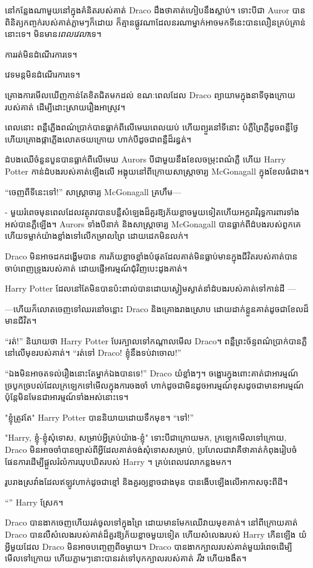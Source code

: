 នៅកន្លែងណាមួយនៅក្នុងគំនិតរបស់គាត់ Draco ដឹងថាគាត់ហៀបនឹងស្លាប់។ ទោះបីជា Auror បានពិនិត្យកញ្ចក់របស់គាត់ភ្លាមៗក៏ដោយ ក៏គ្មានផ្លូវណាដែលនរណាម្នាក់អាចមកទីនេះបានលឿនគ្រប់គ្រាន់នោះទេ។ មិនមាន\emph{ពេលវេលា}ទេ។

ការរត់មិនដំណើរការទេ។

វេទមន្តមិនដំណើរការទេ។

គ្រោងការមើលឃើញកាន់តែខិតជិតមកដល់ ខណៈពេលដែល Draco ព្យាយាមក្នុងនាទីចុងក្រោយរបស់គាត់ ដើម្បីដោះស្រាយរឿងអាស្រូវ។

ពេលនោះ ពន្លឺភ្លើងពណ៌ប្រាក់បានធ្លាក់ពីលើមេឃពេលយប់ ហើយព្យួរនៅទីនោះ បំភ្លឺព្រៃភ្លឺដូចពន្លឺថ្ងៃ ហើយគ្រោងផ្កាភ្លើងលោតថយក្រោយ ហាក់បីដូចជាពន្លឺដ៏រន្ធត់។

ដំបងឈើចំនួនបួនបានធ្លាក់ពីលើមេឃ Aurors បីជាមួយនឹងខែលចម្រុះពណ៌ភ្លឺ ហើយ Harry Potter កាន់ដំបងរបស់គាត់ឡើងលើ អង្គុយនៅពីក្រោយសាស្រ្តាចារ្យ McGonagall ក្នុងខែលធំជាង។

“ចេញពីទីនេះទៅ!” សាស្រ្តាចារ្យ McGonagall គ្រហឹម—

\begin{em}
- មួយរំពេចមុនពេលដែលវត្ថុរាវបានបន្លឺសំឡេងដ៏គួរឱ្យភ័យខ្លាចមួយទៀតហើយអក្ខរាវិរុទ្ធការពារទាំងអស់បានភ្លឺឡើង។ Aurors ទាំងបីនាក់ និងសាស្រ្តាចារ្យ McGonagall បានធ្លាក់ពីដំបងរបស់ពួកគេ ហើយទម្លាក់យ៉ាងខ្លាំងទៅលើកម្រាលព្រៃ ដោយដេកមិនលក់។

Draco មិន​អាច​ដក​ដង្ហើម​បាន ការ​ភ័យ​ខ្លាច​ខ្លាំង​បំផុត​ដែល​គាត់​មិន​ធ្លាប់​មាន​ក្នុង​ជីវិត​របស់​គាត់​បាន​ចាប់​ពេញ​ទ្រូង​របស់​គាត់ ដោយ​ផ្ញើ​អារម្មណ៍​ជុំវិញ​បេះដូង​គាត់។

Harry Potter ដែល​នៅ​តែ​មិន​បាន​ប៉ះ​ពាល់​បាន​ដោយ​ស្ងៀម​ស្ងាត់​នាំ​ដំបង​របស់​គាត់​ទៅ​កាន់​ដី —

—ហើយ​ក៏​លោត​ចេញ​ទៅ​ឈរ​នៅ​ចន្លោះ Draco និង​គ្រោង​រាង​ស្រោប ដោយ​ដាក់​ខ្លួន​គាត់​ដូច​ជា​ខែល​ដ៏​មាន​ជីវិត។

“រត់!” និយាយ​ថា Harry Potter បែរ​ក្បាល​ទៅ​កណ្តាល​មើល​ Draco។ ពន្លឺព្រះច័ន្ទពណ៌ប្រាក់បានភ្លឺនៅលើមុខរបស់គាត់។ “រត់ទៅ Draco! ខ្ញុំនឹងទប់វាចោល!”

“ឯង​មិន​អាច​តទល់​រឿង​នោះ​តែ​ម្នាក់​ឯង​បាន​ទេ!” Draco យំខ្លាំងៗ។ ចង្អោរ​ក្នុង​ពោះ​គាត់​ជា​អារម្មណ៍​ច្របូកច្របល់​ដែល​ក្រឡេក​ទៅ​មើល​ក្នុង​ការ​ចង​ចាំ ហាក់​ដូច​ជា​មិន​ដូច​អារម្មណ៍​ខុស​ដូច​ជា​មាន​អារម្មណ៍ ប៉ុន្តែ​មិន​មែន​ជា​អារម្មណ៍​ទាំង​អស់​នោះ​ទេ។

"ខ្ញុំត្រូវតែ" Harry Potter បាននិយាយដោយទឹកមុខ។ “ទៅ!”

"Harry, ខ្ញុំ-ខ្ញុំសុំទោស, សម្រាប់អ្វីគ្រប់យ៉ាង-ខ្ញុំ" ទោះបីជាក្រោយមក, ក្រឡេកមើលទៅក្រោយ, Draco មិនអាចចាំបានច្បាស់ពីអ្វីដែលគាត់ចង់សុំទោសសម្រាប់, ប្រហែលជាវាគឺថាគាត់កំពុងរៀបចំផែនការដើម្បីផ្តួលរំលំការឃុបឃិតរបស់ Harry ។ គ្រប់ពេលវេលាកន្លងមក។

រូប​រាង​ស្រវាំង​ដែល​ឥឡូវ​ហាក់​ដូច​ជា​ខ្មៅ និង​គួរ​ឲ្យ​ខ្លាច​ជាង​មុន បាន​ងើប​ឡើង​លើ​អាកាស​ចុះ​ពី​ដី។

“” Harry ស្រែក។

Draco បាន​ងាក​ចេញ​ហើយ​រត់​ចូល​ទៅ​ក្នុង​ព្រៃ ដោយ​មាន​មែក​ឈើ​វាយ​មុខ​គាត់។ នៅពីក្រោយគាត់ Draco បានលឺសំលេងរបស់គាត់ដ៏គួរឱ្យភ័យខ្លាចមួយទៀត ហើយសំលេងរបស់ Harry កើនឡើង យំអ្វីមួយដែល Draco មិនអាចបញ្ចេញពីចម្ងាយ។ Draco បានងាកក្បាលរបស់គាត់មួយរំពេចដើម្បីមើលទៅក្រោយ ហើយភ្លាមៗនោះបានរត់ទៅបុកក្បាលរបស់គាត់ \emph{រឹង} ហើយងងឹត។
\end{em}

